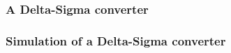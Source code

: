 


\frame
{
\frametitle{A Delta-Sigma converter}

\begin{figure}
 \scalebox{0.3}{
    
}
\end{figure}
}
\frame
{
\frametitle{Simulation of a Delta-Sigma converter}


\begin{figure}[h]

\end{figure}



}